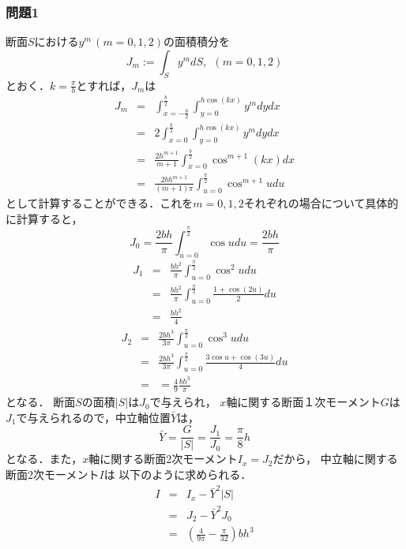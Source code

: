 \documentclass[10pt,a4j]{jarticle}
\begin{document}
\subsubsection*{問題1}
断面$S$における$y^m\,(m=0,1,2)$の面積積分を
\begin{equation}
	J_m:=\int_S y^m dS, \ \ (m=0,1,2)
\end{equation}
とおく．$k=\frac{\pi}{b}$とすれば，$J_m$は
\begin{eqnarray}
	J_m 
	&=& 
	\int_{x=-\frac{b}{2}}^{\frac{b}{2}} \int_{y=0}^{h\cos(kx)}y^m dydx \\
	&=& 
	2\int_{x=0}^{\frac{b}{2}} \int_{y=0}^{h\cos(kx)}y^m dydx \\
	&=& 
	\frac{2h^{m+1}}{m+1}\int_{x=0}^{\frac{b}{2}} \cos^{m+1}(kx)dx \\
	&=& 
	\frac{2bh^{m+1}}{(m+1)\pi}\int_{u=0}^{\frac{\pi}{2}} \cos^{m+1}u du
\end{eqnarray}
として計算することができる．これを$m=0,1,2$それぞれの場合について具体的に計算すると，
\begin{equation}
	J_0=
	\frac{2bh}{\pi}\int_{u=0}^{\frac{\pi}{2}} \cos u du = \frac{2bh}{\pi}
\end{equation}
\begin{eqnarray}
	J_1
	&=&
	\frac{bh^2}{\pi}\int_{u=0}^{\frac{\pi}{2}} \cos^2 u du \\
	&=&
	\frac{bh^2}{\pi}\int_{u=0}^{\frac{\pi}{2}} \frac{1+\cos(2u)}{2} du \\
	&=& \frac{bh^2}{4}
\end{eqnarray}
\begin{eqnarray}
	J_2
	&=&
	\frac{2bh^3}{3\pi}\int_{u=0}^{\frac{\pi}{2}} \cos^3 u du \\
	&=&
	\frac{2bh^3}{3\pi}\int_{u=0}^{\frac{\pi}{2}} \frac{3\cos u + \cos (3u) }{4} du \\
	&=&
	=\frac{4}{9}\frac{bh^3}{\pi}
\end{eqnarray}
となる．
断面$S$の面積$\left| S \right|$は$J_0$で与えられ，
$x$軸に関する断面１次モーメント$G$は$J_1$で与えられるので，中立軸位置$\bar Y$は，
\begin{equation}
	\bar Y =\frac{G}{\left| S\right|}=\frac{J_1}{J_0}=\frac{\pi}{8}h
\end{equation}
となる．また，$x$軸に関する断面2次モーメント$I_x=J_2$だから，
中立軸に関する断面2次モーメント$I$は
以下のように求められる．
\begin{eqnarray}
	I & =& I_x -\bar Y^2 \left| S\right| \\
	&=& J_2-\bar Y^2 J_0 \\
	&=& \left( \frac{4}{9\pi}-\frac{\pi}{32} \right) bh^3
\end{eqnarray}
\end{document}
